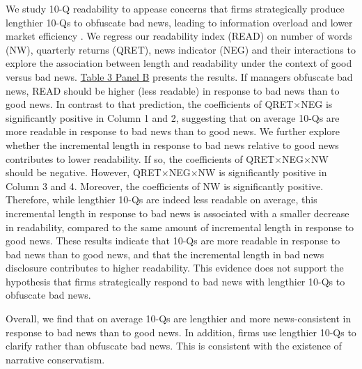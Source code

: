 \documentclass[letterpaper,12pt]{article}
\begin{document}
\begin{spacing}{1.5}
We study 10-Q readability to appease concerns that firms strategically produce lengthier 10-Qs to obfuscate bad news, leading to information overload and lower market efficiency \cite{chapmanInformationOverloadDisclosure2019}. We regress our readability index (READ) on number of words (NW), quarterly returns (QRET), news indicator (NEG) and their interactions to explore the association between length and readability under the context of good versus bad news. \hyperref[T3PB]{Table 3 Panel B} presents the results. If managers obfuscate bad news, READ should be higher (less readable) in response to bad news than to good news. In contrast to that prediction, the coefficients of QRET$\times$NEG is significantly positive in Column 1 and 2, suggesting that on average 10-Qs are more readable in response to bad news than to good news. We further explore whether the incremental length in response to bad news relative to good news contributes to lower readability. If so, the coefficients of QRET$\times$NEG$\times$NW should be negative. However, QRET$\times$NEG$\times$NW is significantly positive in Column 3 and 4. Moreover, the coefficients of NW is significantly positive. Therefore, while lengthier 10-Qs are indeed less readable on average, this incremental length in response to bad news is associated with a smaller decrease in readability, compared to the same amount of incremental length in response to good news. These results indicate that 10-Qs are more readable in response to bad news than to good news, and that the incremental length in bad news disclosure contributes to higher readability. This evidence does not support the hypothesis that firms strategically respond to bad news with lengthier 10-Qs to obfuscate bad news. 

Overall, we find that on average 10-Qs are lengthier and more news-consistent in response to bad news than to good news. In addition, firms use lengthier 10-Qs to clarify rather than obfuscate bad news. This is consistent with the existence of narrative conservatism.


\end{spacing}
\end{document}
